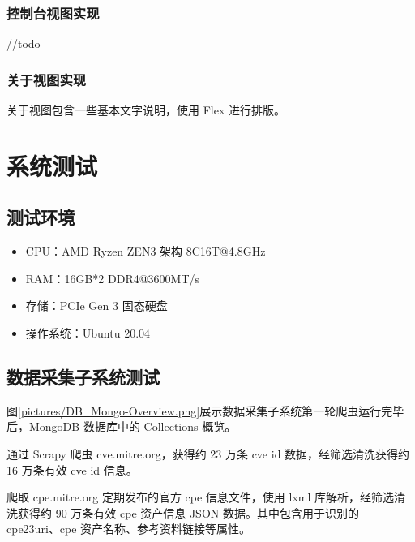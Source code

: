 \documentclass[a4paper,AutoFakeBold,oneside,12pt]{book}
\begin{document}
\subsection{控制台视图实现}

//todo

\subsection{关于视图实现}

关于视图包含一些基本文字说明，使用 Flex 进行排版。

\chapter{系统测试}

\section{测试环境}

\begin{itemize}
	\item CPU：AMD Ryzen ZEN3 架构 8C16T@4.8GHz
	\item RAM：16GB*2 DDR4@3600MT/s
	\item 存储：PCIe Gen 3 固态硬盘
	\item 操作系统：Ubuntu 20.04
\end{itemize}

\section{数据采集子系统测试}

图\ref{pictures/DB_Mongo-Overview.png}展示数据采集子系统第一轮爬虫运行完毕后，MongoDB 数据库中的 Collections 概览。


通过 Scrapy 爬虫 cve.mitre.org，获得约 23 万条 cve id 数据，经筛选清洗获得约 16 万条有效 cve id 信息。%


爬取 cpe.mitre.org 定期发布的官方 cpe 信息文件，使用 lxml 库解析，经筛选清洗获得约 90 万条有效 cpe 资产信息 JSON 数据。其中包含用于识别的 cpe23uri、cpe 资产名称、参考资料链接等属性。%
\end{document}
